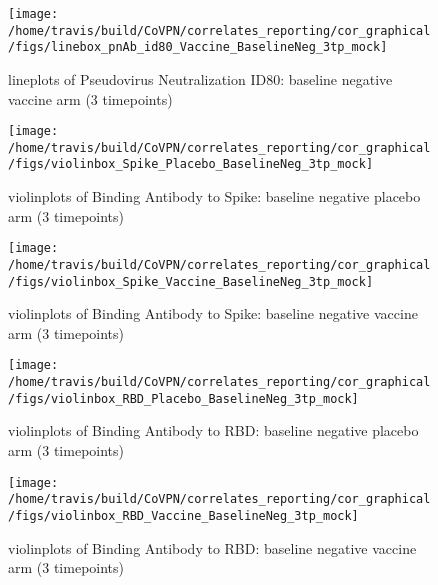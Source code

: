 \documentclass[]{book}
\theoremstyle{definition}
\theoremstyle{definition}
\theoremstyle{definition}
\newcommand{\1}{\mathbbm{1}}
\begin{document}
\clearpage
\begin{figure}[H]

{\centering \texttt{[image: /home/travis/build/CoVPN/correlates\_reporting/cor\_graphical/figs/linebox\_pnAb\_id80\_Vaccine\_BaselineNeg\_3tp\_mock]} 

}

\caption{lineplots of Pseudovirus Neutralization ID80: baseline negative vaccine arm (3 timepoints)}\label{fig:unnamed-chunk-50}
\end{figure}

\clearpage
\begin{figure}[H]

{\centering \texttt{[image: /home/travis/build/CoVPN/correlates\_reporting/cor\_graphical/figs/violinbox\_Spike\_Placebo\_BaselineNeg\_3tp\_mock]} 

}

\caption{violinplots of Binding Antibody to Spike: baseline negative placebo arm (3 timepoints)}\label{fig:unnamed-chunk-51}
\end{figure}

\clearpage
\begin{figure}[H]

{\centering \texttt{[image: /home/travis/build/CoVPN/correlates\_reporting/cor\_graphical/figs/violinbox\_Spike\_Vaccine\_BaselineNeg\_3tp\_mock]} 

}

\caption{violinplots of Binding Antibody to Spike: baseline negative vaccine arm (3 timepoints)}\label{fig:unnamed-chunk-52}
\end{figure}

\clearpage
\begin{figure}[H]

{\centering \texttt{[image: /home/travis/build/CoVPN/correlates\_reporting/cor\_graphical/figs/violinbox\_RBD\_Placebo\_BaselineNeg\_3tp\_mock]} 

}

\caption{violinplots of Binding Antibody to RBD: baseline negative placebo arm (3 timepoints)}\label{fig:unnamed-chunk-53}
\end{figure}

\clearpage
\begin{figure}[H]

{\centering \texttt{[image: /home/travis/build/CoVPN/correlates\_reporting/cor\_graphical/figs/violinbox\_RBD\_Vaccine\_BaselineNeg\_3tp\_mock]} 

}

\caption{violinplots of Binding Antibody to RBD: baseline negative vaccine arm (3 timepoints)}\label{fig:unnamed-chunk-54}
\end{figure}
\end{document}
